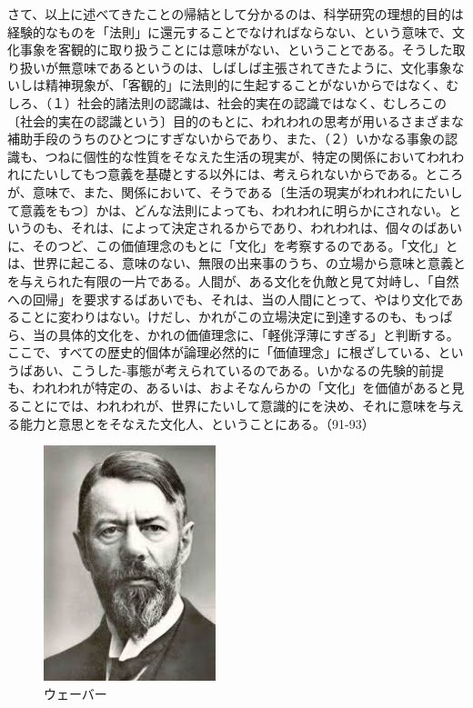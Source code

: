 さて、以上に述べてきたことの帰結として分かるのは、科学研究の理想的目的は経験的なものを「法則」に還元することでなければならない、という意味で、文化事象を客観的に取り扱うことには意味がない、ということである。そうした取り扱いが無意味であるというのは、しばしば主張されてきたように、文化事象ないしは精神現象が、「客観的」に法則的に生起することがないからではなく、むしろ、（１）社会的諸法則の認識は、社会的実在の認識ではなく、むしろこの〔社会的実在の認識という〕目的のもとに、われわれの思考が用いるさまざまな補助手段のうちのひとつにすぎないからであり、また、（２）いかなる事象の認識も、つねに個性的な性質をそなえた生活の現実が、特定の関係においてわれわれにたいしてもつ意義を基礎とする以外には、考えられないからである。ところが、意味で、また、関係において、そうである〔生活の現実がわれわれにたいして意義をもつ〕かは、どんな法則によっても、われわれに明らかにされない。というのも、それは、によって決定されるからであり、われわれは、個々のばあいに、そのつど、この価値理念のもとに「文化」を考察するのである。「文化」とは、世界に起こる、意味のない、無限の出来事のうち、の立場から意味と意義とを与えられた有限の一片である。人間が、ある文化を仇敵と見て対峙し、「自然への回帰」を要求するばあいでも、それは、当の人間にとって、やはり文化であることに変わりはない。けだし、かれがこの立場決定に到達するのも、もっぱら、当の具体的文化を、かれの価値理念に、「軽佻浮薄にすぎる」と判断する。ここで、すべての歴史的個体が論理必然的に「価値理念」に根ざしている、というばあい、こうした‐事態が考えられているのである。いかなるの先験的前提も、われわれが特定の、あるいは、およそなんらかの「文化」を価値があると見ることにでは、われわれが、世界にたいして意識的にを決め、それに意味を与える能力と意思とをそなえた文化人、ということにある。（91-93）




  \begin{figure}[htbp]
    \centering
      \includegraphics[width=50mm]{images/weber.jpg}
      \caption{ウェーバー} 
  \end{figure}



